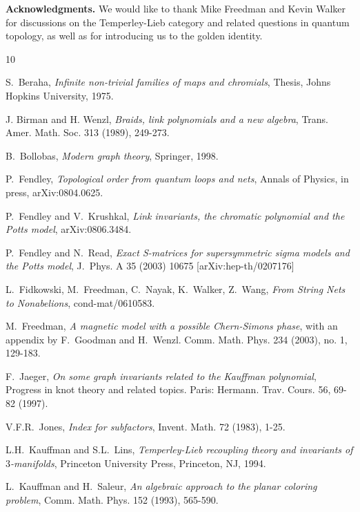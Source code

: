 \documentclass[11pt]{amsart}
\numberwithin{equation}{section}
\theoremstyle{definition}
\begin{document}
\medskip

{\bf Acknowledgments.} We would like to thank Mike Freedman and Kevin
Walker for discussions on the Temperley-Lieb category and related
questions in quantum topology, as well as for introducing us to the
golden identity.



\begin{thebibliography}{10}

 S.~Beraha, {\em Infinite non-trivial families of maps and chromials}, Thesis, Johns Hopkins
University, 1975.

 J. Birman and H. Wenzl, {\em Braids, link polynomials and a new
algebra}, Trans. Amer. Math. Soc. 313 (1989), 249-273.

 B.~Bollobas, {\em Modern graph theory}, Springer, 1998.

 P.~Fendley, {\em Topological order from quantum loops and nets},
Annals of Physics, in press, arXiv:0804.0625.



 P.~Fendley and V.~Krushkal,  {\em Link invariants, the chromatic polynomial
and the Potts model}, arXiv:0806.3484.

P.~Fendley and N.~Read,
{\em Exact S-matrices for supersymmetric sigma models and the Potts
  model},
J.~Phys. A 35 (2003) 10675
[arXiv:hep-th/0207176]

L.~Fidkowski, M.~Freedman, C.~Nayak, K.~Walker, Z.~Wang,
{\em From String Nets to Nonabelions},
cond-mat/0610583.



 M.~Freedman, {\em A magnetic model with a possible Chern-Simons
phase},  with an appendix by F.~Goodman and H.~Wenzl. Comm. Math. Phys.  234  (2003),  no. 1, 129-183.

 F.~Jaeger, {\em On some graph invariants related to the Kauffman polynomial},
Progress in knot theory and related topics. Paris: Hermann. Trav. Cours. 56, 69-82 (1997).

 V.F.R.~Jones,
{\em Index for subfactors},  Invent. Math. 72 (1983), 1-25.

 L.H.~Kauffman and S.L.~Lins,
{\em Temperley-Lieb recoupling theory and invariants of $3$-manifolds},
Princeton University Press, Princeton, NJ, 1994.

 L.~Kauffman and H.~Saleur, {\em An algebraic approach to the planar coloring problem},
 Comm. Math. Phys.  152  (1993),  565-590.


\end{thebibliography}
\end{document}
